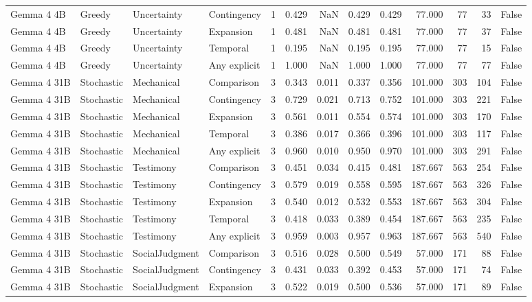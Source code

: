\begin{tabular}{llllrrrrrrrrr}
Gemma 4 4B & Greedy & Uncertainty & Contingency & 1 & 0.429 & NaN & 0.429 & 0.429 & 77.000 & 77 & 33 & False \\
Gemma 4 4B & Greedy & Uncertainty & Expansion & 1 & 0.481 & NaN & 0.481 & 0.481 & 77.000 & 77 & 37 & False \\
Gemma 4 4B & Greedy & Uncertainty & Temporal & 1 & 0.195 & NaN & 0.195 & 0.195 & 77.000 & 77 & 15 & False \\
Gemma 4 4B & Greedy & Uncertainty & Any explicit & 1 & 1.000 & NaN & 1.000 & 1.000 & 77.000 & 77 & 77 & False \\
Gemma 4 31B & Stochastic & Mechanical & Comparison & 3 & 0.343 & 0.011 & 0.337 & 0.356 & 101.000 & 303 & 104 & False \\
Gemma 4 31B & Stochastic & Mechanical & Contingency & 3 & 0.729 & 0.021 & 0.713 & 0.752 & 101.000 & 303 & 221 & False \\
Gemma 4 31B & Stochastic & Mechanical & Expansion & 3 & 0.561 & 0.011 & 0.554 & 0.574 & 101.000 & 303 & 170 & False \\
Gemma 4 31B & Stochastic & Mechanical & Temporal & 3 & 0.386 & 0.017 & 0.366 & 0.396 & 101.000 & 303 & 117 & False \\
Gemma 4 31B & Stochastic & Mechanical & Any explicit & 3 & 0.960 & 0.010 & 0.950 & 0.970 & 101.000 & 303 & 291 & False \\
Gemma 4 31B & Stochastic & Testimony & Comparison & 3 & 0.451 & 0.034 & 0.415 & 0.481 & 187.667 & 563 & 254 & False \\
Gemma 4 31B & Stochastic & Testimony & Contingency & 3 & 0.579 & 0.019 & 0.558 & 0.595 & 187.667 & 563 & 326 & False \\
Gemma 4 31B & Stochastic & Testimony & Expansion & 3 & 0.540 & 0.012 & 0.532 & 0.553 & 187.667 & 563 & 304 & False \\
Gemma 4 31B & Stochastic & Testimony & Temporal & 3 & 0.418 & 0.033 & 0.389 & 0.454 & 187.667 & 563 & 235 & False \\
Gemma 4 31B & Stochastic & Testimony & Any explicit & 3 & 0.959 & 0.003 & 0.957 & 0.963 & 187.667 & 563 & 540 & False \\
Gemma 4 31B & Stochastic & SocialJudgment & Comparison & 3 & 0.516 & 0.028 & 0.500 & 0.549 & 57.000 & 171 & 88 & False \\
Gemma 4 31B & Stochastic & SocialJudgment & Contingency & 3 & 0.431 & 0.033 & 0.392 & 0.453 & 57.000 & 171 & 74 & False \\
Gemma 4 31B & Stochastic & SocialJudgment & Expansion & 3 & 0.522 & 0.019 & 0.500 & 0.536 & 57.000 & 171 & 89 & False \\

\end{tabular}
